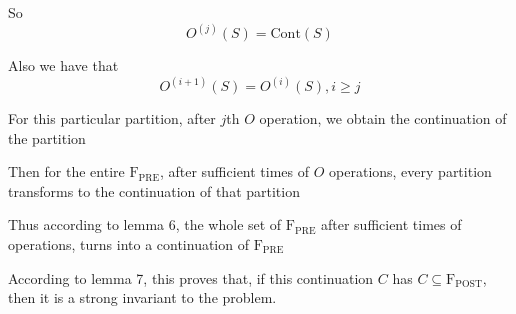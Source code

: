 \documentclass[letterpaper,]{article}
\begin{document}
So \[O^{(j)}(S) = \mathrm{Cont}(S)\]

Also we have that \[O^{(i + 1)}(S) = O^{(i)}(S), i \ge j\]

For this particular partition, after \(j\)th \(O\) operation, we obtain
the continuation of the partition

Then for the entire \(\mathrm{F_{PRE}}\), after sufficient times of
\(O\) operations, every partition transforms to the continuation of that
partition

Thus according to lemma 6, the whole set of \(\mathrm{F_{PRE}}\) after
sufficient times of operations, turns into a continuation of
\(\mathrm{F_{PRE}}\)

According to lemma 7, this proves that, if this continuation \(C\) has
\(C\subseteq \mathrm{F_{POST}}\), then it is a strong invariant to the
problem.
\end{document}
